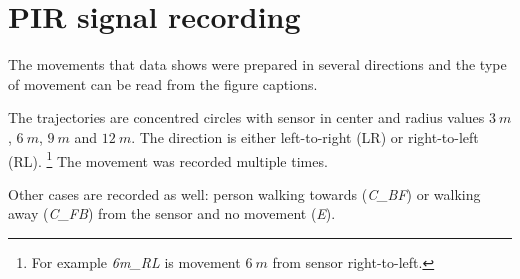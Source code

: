 






\chapter{PIR signal recording}
\label{appendix:PIRSignal}

The movements that data shows were prepared in several directions
and the type of movement can be read from the figure captions.

The trajectories are concentred circles with sensor in center and
radius values $3~m$, $6~m$, $9~m$ and $12~m$. The direction is
either left-to-right (LR) or right-to-left (RL).
\footnote{For example {\it 6m\_RL} is movement $6~m$ from sensor right-to-left.}
The movement was recorded multiple times.

Other cases are recorded as well: person walking towards ({\it C\_BF})
or walking away ({\it C\_FB}) from the sensor and no movement ({\it E}). 

